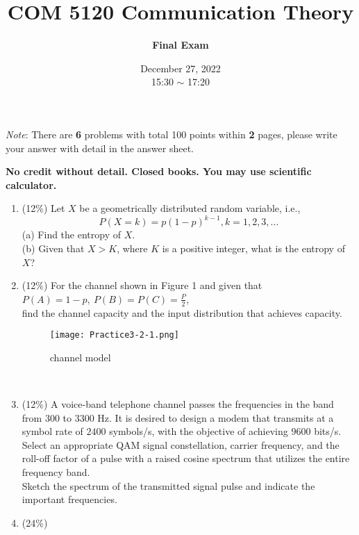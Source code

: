\documentclass[a4paper,12pt]{article}
\title{\textbf{COM 5120 Communication Theory}}
\author{\textbf{Final Exam}}
\date{December 27, 2022\\
15:30 $\sim$ 17:20
}
\begin{document}
    \maketitle
    \textit{Note}: There are \textbf{6} problems with total 100 points within \textbf{2} pages, please write your answer with detail in the answer sheet.

    {\bf No credit without detail. Closed books. You may use scientific calculator.}

    \begin{enumerate}
        \item (12\%)
            Let $X$ be a geometrically distributed random variable, i.e., $$P(X = k) = p(1-p)^{k - 1}, k = 1, 2, 3, ...$$
            (a) Find the entropy of $X$. \\ 
            (b) Given that $X > K$, where $K$ is a positive integer, what is the entropy of $X$? \\ 
        \item (12\%)
            For the channel shown in Figure 1 and given that $P(A) = 1 - p, \ P(B) = P(C) = \frac{P}{2}$, \\
            find the channel capacity and the input distribution that achieves capacity. 
            \begin{figure}[h]
                \centering
                \texttt{[image: Practice3-2-1.png]}
                \caption{channel model}
            \end{figure} \\ 
        \item (12\%)
            A voice-band telephone channel passes the frequencies in the band from $300$ to $3300$ Hz. It is desired to design a modem that transmits at a symbol rate of $2400$ symbols/s, with the objective of achieving $9600$ bits/s. \\
            Select an appropriate QAM signal constellation, carrier frequency, and the roll-off factor of a pulse with a raised cosine spectrum that utilizes the entire frequency band. \\
            Sketch the spectrum of the transmitted signal pulse and indicate the important frequencies. \\
        \item (24\%) 

\end{enumerate}
\end{document}
